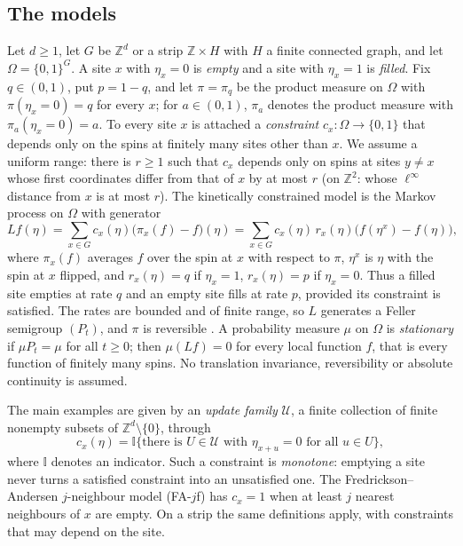 \documentclass[11pt]{amsart}
\theoremstyle{remark}
\newcommand{\Z}{\mathbb{Z}}
\newcommand{\cU}{\mathcal{U}}
\begin{document}
\subsection{The models}
Let $d\ge1$, let $G$ be $\Z^d$ or a strip $\Z\times H$ with $H$ a finite connected graph, and let
$\Omega=\{0,1\}^G$. A site $x$ with $\eta_x=0$ is \emph{empty} and a site with $\eta_x=1$ is \emph{filled}. Fix
$q\in(0,1)$, put $p=1-q$, and let $\pi=\pi_q$ be the product measure on $\Omega$ with $\pi(\eta_x=0)=q$ for every
$x$; for $a\in(0,1)$, $\pi_a$ denotes the product measure with $\pi_a(\eta_x=0)=a$. To every site $x$ is attached a
\emph{constraint} $c_x\colon\Omega\to\{0,1\}$ that depends only on the spins at finitely many sites other than $x$.
We assume a uniform range: there is $r\ge1$ such that $c_x$ depends only on spins at sites $y\ne x$ whose first
coordinates differ from that of $x$ by at most $r$ (on $\Z^2$: whose $\ell^\infty$ distance from $x$ is at most $r$).
The kinetically constrained model is the Markov process on $\Omega$ with generator
\begin{equation}\label{eq:generator}
Lf(\eta)=\sum_{x\in G}c_x(\eta)\bigl(\pi_x(f)-f\bigr)(\eta)=\sum_{x\in G}c_x(\eta)\,r_x(\eta)\bigl(f(\eta^x)-f(\eta)\bigr),
\end{equation}
where $\pi_x(f)$ averages $f$ over the spin at $x$ with respect to $\pi$, $\eta^x$ is $\eta$ with the spin at $x$
flipped, and $r_x(\eta)=q$ if $\eta_x=1$, $r_x(\eta)=p$ if $\eta_x=0$. Thus a filled site empties at rate $q$ and an
empty site fills at rate $p$, provided its constraint is satisfied. The rates are bounded and of finite range, so $L$
generates a Feller semigroup $(P_t)$, and $\pi$ is reversible \cite{CMRT08,HT25}. A probability measure $\mu$ on
$\Omega$ is \emph{stationary} if $\mu P_t=\mu$ for all $t\ge0$; then $\mu(Lf)=0$ for every local function $f$, that is
every function of finitely many spins. No translation invariance, reversibility or absolute continuity is assumed.

The main examples are given by an \emph{update family} $\cU$, a finite collection of finite nonempty subsets of
$\Z^d\setminus\{0\}$, through
\begin{equation}\label{eq:update}
c_x(\eta)=\mathbb I\{\text{there is }U\in\cU\text{ with }\eta_{x+u}=0\text{ for all }u\in U\},
\end{equation}
where $\mathbb I$ denotes an indicator.
Such a constraint is \emph{monotone}: emptying a site never turns a satisfied constraint into an unsatisfied one. The
Fredrickson--Andersen $j$-neighbour model (FA-$j$f) \cite{FA84} has $c_x=1$ when at least $j$ nearest neighbours of $x$
are empty. On a strip the same definitions apply, with constraints that may depend on the site.
\end{document}
